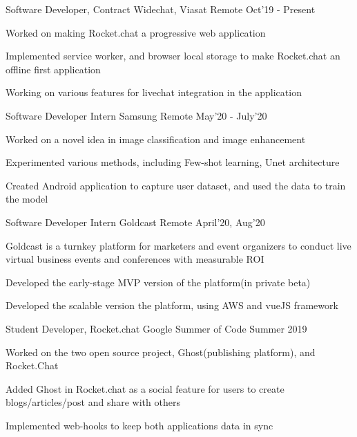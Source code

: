 \begin{cventries}

  \cventry
  {Software Developer, Contract}
  {Widechat, Viasat}
  {Remote}
  {Oct'19 - Present}
  {
    \begin{cvitems}
        \item {Worked on making Rocket.chat a progressive web application}
        \item {Implemented service worker, and browser local storage to make Rocket.chat an offline first application}
        \item {Working on various features for livechat integration in the application}
    \end{cvitems}
  }

  \cventry
  {Software Developer Intern}
  {Samsung}
  {Remote}
  {May'20 - July'20}
  {
    \begin{cvitems}
        \item {Worked on a novel idea in image classification and image enhancement}
        \item {Experimented various methods, including Few-shot learning, Unet architecture}
        \item {Created Android application to capture user dataset, and used the data to train the model}
    \end{cvitems}
  }

  \cventry
  {Software Developer Intern}
  {Goldcast}
  {Remote}
  {April'20, Aug'20}
  {
    \begin{cvitems}
        \item {Goldcast is a turnkey platform for marketers and event organizers to conduct live virtual business events and conferences with measurable ROI}
        \item {Developed the early-stage MVP version of the platform(in private beta)}
        \item {Developed the scalable version the platform, using AWS and vueJS framework}
    \end{cvitems}
  }

  \cventry
  {Student Developer, Rocket.chat}
  {Google Summer of Code}
  {}
  {Summer 2019}
  {
    \begin{cvitems}
        \item {Worked on the two open source project, Ghost(publishing platform), and Rocket.Chat}
        \item {Added Ghost in Rocket.chat as a social feature for users to create blogs/articles/post and share with others}
        \item {Implemented web-hooks to keep both applications data in sync}
    \end{cvitems}
  }
  

\end{cventries}
